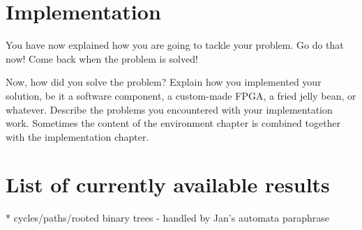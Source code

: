 \chapter{Implementation}
\label{chapter:implementation}

You have now explained how you are going to tackle your problem. 
Go do that now! Come back when the problem is solved!

Now, how did you solve the problem? 
Explain how you implemented your solution, be it a software component, a
custom-made FPGA, a fried jelly bean, or whatever.
Describe the problems you encountered with your implementation
work. Sometimes the content of the environment chapter is combined
together with the implementation chapter.

\chapter{List of currently available results}
\label{chapter:results}

* cycles/paths/rooted binary trees - handled by Jan's automata paraphrase

